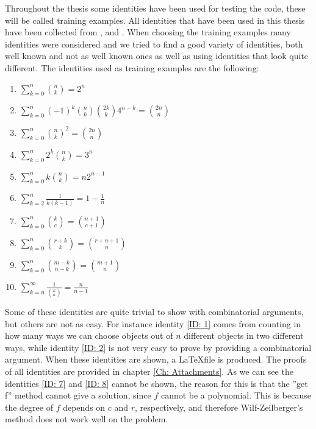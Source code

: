 Throughout the thesis some identities have been used for testing the code, these will be called training examples. All identities that have been used in this thesis have been collected from , and . When choosing the training examples many identities were considered and we tried to find a good variety of identities, both well known and not as well known ones as well as using identities that look quite different. The identities used as training examples are the following:
\begin{enumerate}
  \item $\sum_{k=0}^n \binom{n}{k} = 2^n$ \label{ID: 1}
  \item $\sum_{k=0}^n (-1)^k\binom{n}{k}\binom{2k}{k}4^{n-k}=\binom{2n}{n}$ \label{ID: 2}
  \item $\sum_{k=0}^n \binom{n}{k}^2 = \binom{2n}{n}$ \label{ID: 3}
  \item $\sum_{k=0}^n 2^k\binom{n}{k} = 3^n$ \label{ID: 4}
  \item $\sum_{k=0}^n k\binom{n}{k} = n2^{n-1}$ \label{ID: 5}
  \item $\sum_{k=2}^n \frac{1}{k(k-1)} = 1-\frac{1}{n}$ \label{ID: 6}
  \item $\sum_{k=0}^n \binom{k}{c} = \binom{n+1}{c+1}$ \label{ID: 7}
  \item $\sum_{k=0}^n \binom{r+k}{k} = \binom{r+n+1}{n}$ \label{ID: 8}
  \item $\sum_{k=0}^n \binom{m-k}{n-k} = \binom{m+1}{n}$ \label{ID: 9}
  \item $\sum_{k=n}^\infty \frac{1}{\binom{k}{n}}=\frac{n}{n-1}$ \label{ID: 10}
\end{enumerate}
Some of these identities are quite trivial to show with combinatorial arguments, but others are not as easy. For instance identity \ref{ID: 1} comes from counting in how many ways we can choose objects out of $n$ different objects in two different ways, while identity \ref{ID: 2} is not very easy to prove by providing a combinatorial argument. When these identities are shown, a \LaTeX file is produced. The proofs of all identities are provided in chapter \ref{Ch: Attachments}. As we can see the identities \ref{ID: 7} and \ref{ID: 8} cannot be shown, the reason for this is that the ''get f'' method cannot give a solution, since $f$ cannot be a polynomial. This is because the degree of $f$ depends on $c$ and $r$, respectively, and therefore Wilf-Zeilberger's method does not work well on the problem.


